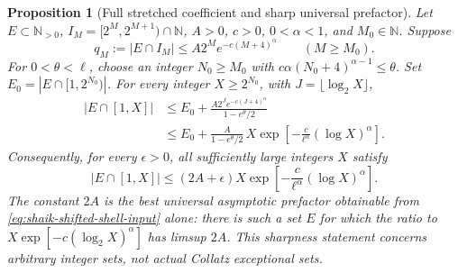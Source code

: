 \documentclass[11pt]{article}
\newtheorem{proposition}{Proposition}
\theoremstyle{remark}\newtheorem{remark}[proposition]{Remark}
\newcommand{\NN}{\mathbb N}
\begin{document}
\begin{proposition}[Full stretched coefficient and sharp universal prefactor]
\label{prop:shaik-sharp-shell}
Let \(E\subset\NN_{>0}\), \(I_M=[2^M,2^{M+1})\cap\NN\),
\(A>0\), \(c>0\), \(0<\alpha<1\), and \(M_0\in\NN\). Suppose
\begin{equation}\label{eq:shaik-shifted-shell-input}
 q_M:=|E\cap I_M|\le A2^M e^{-c(M+4)^\alpha}
 \qquad(M\ge M_0).
\end{equation}
For \(0<\theta<\ell\), choose an integer \(N_0\ge M_0\) with
\(c\alpha(N_0+4)^{\alpha-1}\le\theta\).
Set \(E_0=|E\cap[1,2^{N_0})|\). For every integer \(X\ge2^{N_0}\),
with \(J=\lfloor\log_2X\rfloor\),
\begin{align}
 |E\cap[1,X]|
 &\le E_0+
 \frac{A2^J e^{-c(J+4)^\alpha}}{1-e^\theta/2}\nonumber\\
 &\le E_0+\frac{A}{1-e^\theta/2}\,
 X\exp\left[-\frac{c}{\ell^\alpha}(\log X)^\alpha\right].
 \label{eq:shaik-sharp-shell-finite}
\end{align}
Consequently, for every \(\epsilon>0\), all sufficiently large
integers \(X\) satisfy
\begin{equation}\label{eq:shaik-sharp-shell-asymptotic}
 |E\cap[1,X]|\le(2A+\epsilon)X
 \exp\left[-\frac{c}{\ell^\alpha}(\log X)^\alpha\right].
\end{equation}
The constant \(2A\) is the best universal asymptotic prefactor obtainable
from \eqref{eq:shaik-shifted-shell-input} alone: there is such a set
\(E\) for which the ratio to
\(X\exp[-c(\log_2X)^\alpha]\) has limsup \(2A\).
This sharpness statement concerns arbitrary integer sets, not actual
Collatz exceptional sets.
\end{proposition}
\end{document}
